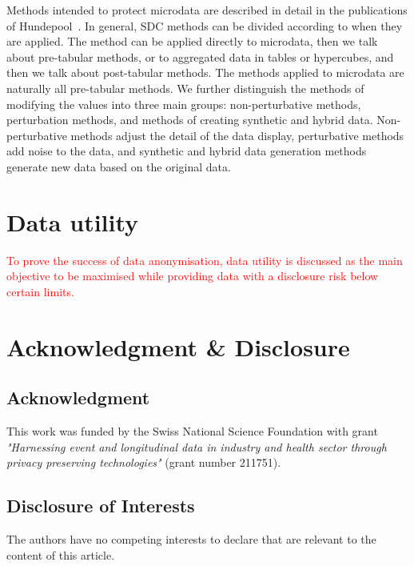 \documentclass{article}
\begin{document}
Methods intended to protect microdata are described in detail in the publications of Hundepool~\cite{2012_Hundepool}. In general, SDC methods can be divided according to when they are applied. The method can be applied directly to microdata, then we talk about pre-tabular methods, or to aggregated data in tables or hypercubes, and then we talk about post-tabular methods. The methods applied to microdata are naturally all pre-tabular methods.
We further distinguish the methods of modifying the values into three main groups: non-perturbative methods, perturbation methods, and methods of creating synthetic and hybrid data. Non-perturbative methods adjust the detail of the data display, perturbative methods add noise to the data, and synthetic and hybrid data generation methods generate new data based on the original data. 

\section{Data utility}

\textcolor{red}{To prove the success of data anonymisation, data utility is discussed as the main objective to be maximised while providing data with a disclosure risk below certain limits.}

\section*{Acknowledgment \& Disclosure} 
\subsection*{Acknowledgment} 
This work was funded by the Swiss National Science
Foundation with grant \textit{"Harnessing event and longitudinal data in industry and health sector through privacy preserving technologies"} (grant number 211751).

\subsection*{Disclosure of Interests} 
The authors have no competing interests to declare that are relevant to the content of this article. 




\end{document}
